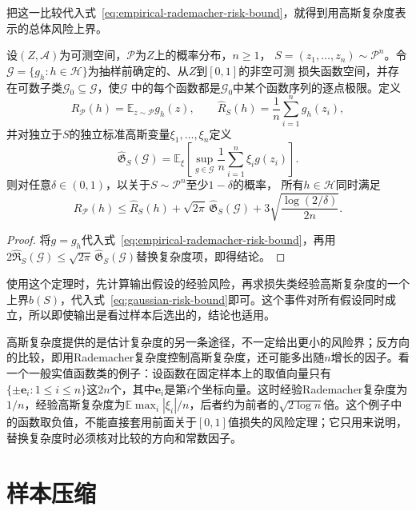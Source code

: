 把这一比较代入式~\eqref{eq:empirical-rademacher-risk-bound}，就得到用高斯复杂度表示的总体风险上界。

\begin{theorem}[高斯复杂度给出的期望风险上界]
\label{thm:gaussian-risk-bound}
设$(Z,\mathcal A)$为可测空间，$\mathcal P$为$Z$上的概率分布，$n\geq1$，
$S=(z_1,\ldots,z_n)\sim\mathcal P^n$。令
$\mathcal G=\{g_h:h\in\mathcal H\}$为抽样前确定的、从$Z$到$[0,1]$的非空可测
损失函数空间，并存在可数子类$\mathcal G_0\subseteq\mathcal G$，使$\mathcal G$
中的每个函数都是$\mathcal G_0$中某个函数序列的逐点极限。定义
\[
 R_{\mathcal P}(h)=\mathbb E_{z\sim\mathcal P}g_h(z),\qquad
 \hat R_S(h)=\frac1n\sum_{i=1}^n g_h(z_i),
\]
并对独立于$S$的独立标准高斯变量$\xi_1,\ldots,\xi_n$定义
\[
 \widehat{\mathfrak G}_S(\mathcal G)
 =\mathbb E_\xi\left[\sup_{g\in\mathcal G}
   \frac1n\sum_{i=1}^n\xi_i g(z_i)\right].
\]
则对任意$\delta\in(0,1)$，以关于$S\sim\mathcal P^n$至少$1-\delta$的概率，
所有$h\in\mathcal H$同时满足
\begin{equation}
 R_{\mathcal P}(h)\leq\hat R_S(h)
 +\sqrt{2\pi}\,\widehat{\mathfrak G}_S(\mathcal G)
 +3\sqrt{\frac{\log(2/\delta)}{2n}}.
 \label{eq:gaussian-risk-bound}
\end{equation}
\end{theorem}

\begin{proof}
将$g=g_h$代入式~\eqref{eq:empirical-rademacher-risk-bound}，再用$2\widehat{\mathfrak R}_S(\mathcal G)\leq\sqrt{2\pi}\,\widehat{\mathfrak G}_S(\mathcal G)$替换复杂度项，即得结论。
\end{proof}

使用这个定理时，先计算输出假设的经验风险，再求损失类经验高斯复杂度的一个上界$b(S)$，代入式~\eqref{eq:gaussian-risk-bound}即可。这个事件对所有假设同时成立，所以即使输出是看过样本后选出的，结论也适用。

高斯复杂度提供的是估计复杂度的另一条途径，不一定给出更小的风险界；反方向的比较，即用Rademacher复杂度控制高斯复杂度，还可能多出随$n$增长的因子。看一个一般实值函数类的例子：设函数在固定样本上的取值向量只有$\{\pm\bm e_i:1\leq i\leq n\}$这$2n$个，其中$\bm e_i$是第$i$个坐标向量。这时经验Rademacher复杂度为$1/n$，经验高斯复杂度为$\mathbb E\max_i|\xi_i|/n$，后者约为前者的$\sqrt{2\log n}$倍。这个例子中的函数取负值，不能直接套用前面关于$[0,1]$值损失的风险定理；它只用来说明，替换复杂度时必须核对比较的方向和常数因子。

\section{样本压缩}
\label{sec:sample-compression}


